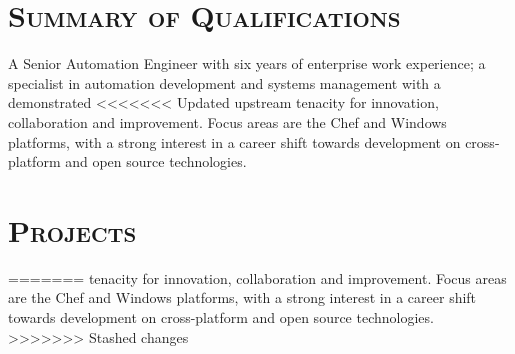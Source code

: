 \documentclass[11pt,letter,roman]{moderncv}
\begin{document}
\makecvtitle{}

\section{\textsc{Summary of Qualifications}}
A Senior Automation Engineer with six years of enterprise work experience; a
specialist in automation development and systems management with a demonstrated
<<<<<<< Updated upstream
tenacity for innovation, collaboration and improvement. Focus areas are the
Chef and Windows platforms, with a strong interest in a career shift towards
development on cross-platform and open source technologies.

\section{\textsc{Projects}}
=======
tenacity for innovation, collaboration and improvement.  Focus areas are the
Chef and Windows platforms, with a strong interest in a career shift towards
development on cross-platform and open source technologies.
>>>>>>> Stashed changes
\end{document}

